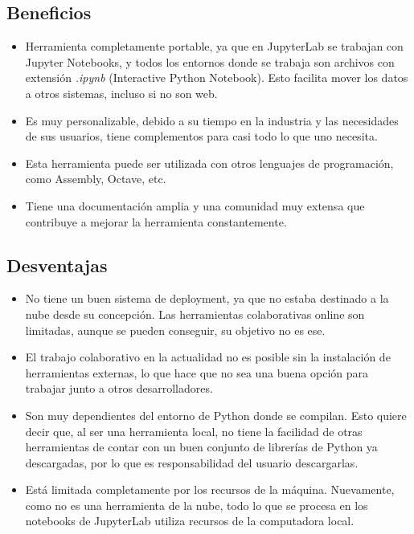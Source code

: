 \documentclass[a4paper,12pt]{article}
\begin{document}
\subsection{Beneficios}
\begin{itemize}
    \item Herramienta completamente portable, ya que en JupyterLab se trabajan con Jupyter Notebooks, y todos los entornos donde se trabaja son archivos con extensión \textit{.ipynb} (Interactive Python Notebook). Esto facilita mover los datos a otros sistemas, incluso si no son web.\cite{jupyter_blog_2021}
    \item Es muy personalizable, debido a su tiempo en la industria y las necesidades de sus usuarios, tiene complementos para casi todo lo que uno necesita.\cite{medium_comparison_2024}
    \item Esta herramienta puede ser utilizada con otros lenguajes de programación, como Assembly, Octave, etc.
    \item Tiene una documentación amplia y una comunidad muy extensa que contribuye a mejorar la herramienta constantemente.
\end{itemize}

\subsection{Desventajas}
\begin{itemize}
    \item No tiene un buen sistema de deployment, ya que no estaba destinado a la nube desde su concepción. Las herramientas colaborativas online son limitadas, aunque se pueden conseguir, su objetivo no es ese.
    \item El trabajo colaborativo en la actualidad no es posible sin la instalación de herramientas externas, lo que hace que no sea una buena opción para trabajar junto a otros desarrolladores.
    \item Son muy dependientes del entorno de Python donde se compilan. Esto quiere decir que, al ser una herramienta local, no tiene la facilidad de otras herramientas de contar con un buen conjunto de librerías de Python ya descargadas, por lo que es responsabilidad del usuario descargarlas.
    \item Está limitada completamente por los recursos de la máquina. Nuevamente, como no es una herramienta de la nube, todo lo que se procesa en los notebooks de JupyterLab utiliza recursos de la computadora local.
\end{itemize}
\end{document}
